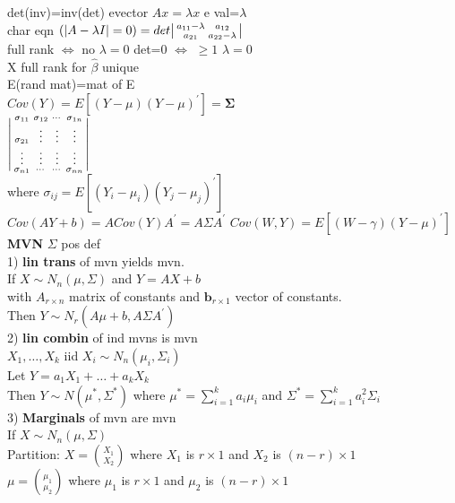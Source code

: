 \documentclass[10pt,landscape]{article}
\newenvironment{lsmallmatrix}
{\left|\begin{smallmatrix}}
	{\end{smallmatrix}\right|}
\newcommand{\lm}{\lambda}
\newcommand{\sg}{\sigma}
\newcommand{\hb}{\hat{\beta}}
\newcommand{\lra}{\Leftrightarrow}
\begin{document}
\begin{multicols*}{4}
det(inv)=inv(det)\quad
evector $Ax=\lm x$\quad
e val=$\lm$\\
char eqn $(|A-\lm I|=0)
=det\begin{lsmallmatrix}
a_{11}-\lm & a_{12}\\
a_{21} & a_{22}-\lm
\end{lsmallmatrix}$\\
full rank $\lra$ no $\lm=0$\quad
det=0  $\lra$ $\geq 1$ $\lm=0$\\
X full rank for $\hb$ unique\\
E(rand mat)=mat of E\\
$Cov(Y)=E[(Y-\mu)(Y-\mu)^{'}]=\bm{\Sigma}$\\
$\begin{lsmallmatrix}
	\sigma_{11}&\sigma_{12}&\cdots& \sg_{1n}\\
	\sg_{21}& \vdots & \vdots & \vdots\\
	\vdots & \vdots & \vdots & \vdots\\
	\sg_{n1} &\cdots & \cdots& \sg_{nn} 
\end{lsmallmatrix}$\\
where $\sg_{ij}=E[(Y_i-\mu_i)(Y_j-\mu_j)^{'}]$\\
$Cov(AY+b)=A Cov(Y)A^{'}=A\Sigma A^{'}$
$Cov(W,Y)=E[(W-\gamma)(Y-\mu)^{'}]$\\
\textbf{MVN}
$\Sigma$ pos def\\
1) \textbf{lin trans} of mvn yields  mvn.\\
	If $X\sim N_n(\mu,\Sigma)$ and $Y=AX+b$\\
	with $A_{r\times n}$  matrix of constants and $\bm{b}_{r \times 1}$ vector of constants.\\
	Then $Y\sim N_r(A\mu+b,A\Sigma A^{'})$\\
	2) \textbf{lin combin} of ind mvns is mvn\\
	$X_1,\dots,X_k$ iid $X_i\sim N_n(\mu_i,\Sigma_i)$\\
	Let $Y=a_1X_1+\dots+a_kX_k$\\
	Then $Y\sim N(\mu^*,\Sigma^*)$ where $\mu^{*}=\sum_{i=1}^{k}a_i\mu_i$ and $\Sigma^*=\sum_{i=1}^{k}a_i^2\Sigma_i$\\
	3) \textbf{Marginals} of mvn are mvn\\
	If $X\sim N_n(\mu,\Sigma)$\\
	Partition:
	$X={X_1 \choose X_2}$ where $X_1$ is $r\times 1$ and $X_2$ is $(n-r)\times 1$\\
	$\mu={\mu_1\choose \mu_2}$ where $\mu_1$ is $r\times 1$ and $\mu_2$ is $(n-r)\times 1$\\

\end{multicols*}
\end{document}
